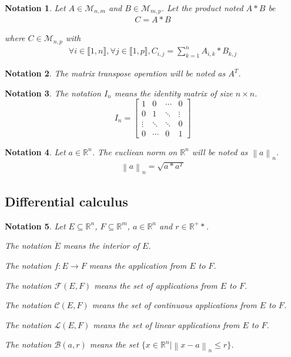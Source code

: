 \documentclass[11pt,en]{elegantpaper}
\newtheorem{notation}{Notation}
\newcommand{\norm}[1]{\left\lVert#1\right\rVert}
\newcommand{\Real}{\mathbb{R}}
\begin{document}
\begin{notation}
  Let $A \in \mathcal{M}_{n,m}$ and $B \in \mathcal{M}_{m,p}$. Let the product noted $A * B$ be \begin{gather*}
    C = A * B
  \end{gather*} \par
  where $C \in \mathcal{M}_{n,p}$ with \begin{gather*}
    \forall i \in \llbracket 1,n \rrbracket, \forall j \in \llbracket 1,p \rrbracket, C_{i,j} = \sum_{k=1}^n A_{i,k} * B_{k,j}
  \end{gather*}

\end{notation}

\begin{notation}
  The matrix transpose operation will be noted as $A^T$.
\end{notation}

\begin{notation}
  The notation $I_n$ means the identity matrix of size $n \times n$. \begin{equation*}
    I_n = \begin{bmatrix}
      1 & 0 & \cdots & 0 \\
      0 & 1 & \ddots & \vdots \\
      \vdots & \ddots & \ddots & 0 \\
      0 & \cdots & 0 & 1
    \end{bmatrix}
  \end{equation*}
\end{notation}

\begin{notation}
  Let $a \in \Real^n$. The eucliean norm on $\Real^n$ will be noted as $\norm a _n$.
  \begin{gather*}
    \norm a _n = \sqrt{a * a^T}
  \end{gather*}
\end{notation}

\subsection{Differential calculus}

\begin{notation}
  Let $E \subseteq \Real^n$, $F \subseteq \Real^m$, $a \in \Real^n$ and $r \in \Real^+*$. \par
  The notation $\mathring{E}$ means the interior of $E$. \par
  The notation $f : E \longrightarrow F$ means the application from $E$ to $F$. \par
  The notation $\mathcal{F}(E,F)$ means the set of applications from $E$ to $F$. \par
  The notation $\mathcal{C}(E,F)$ means the set of continuous applications from $E$ to $F$. \par
  The notation $\mathcal{L}(E,F)$ means the set of linear applications from $E$ to $F$. \par
  The notation $\mathcal{B}(a,r)$ means the set $\{x \in \Real^n | \norm{x - a}_n \leq r\}$.
\end{notation}
\end{document}
